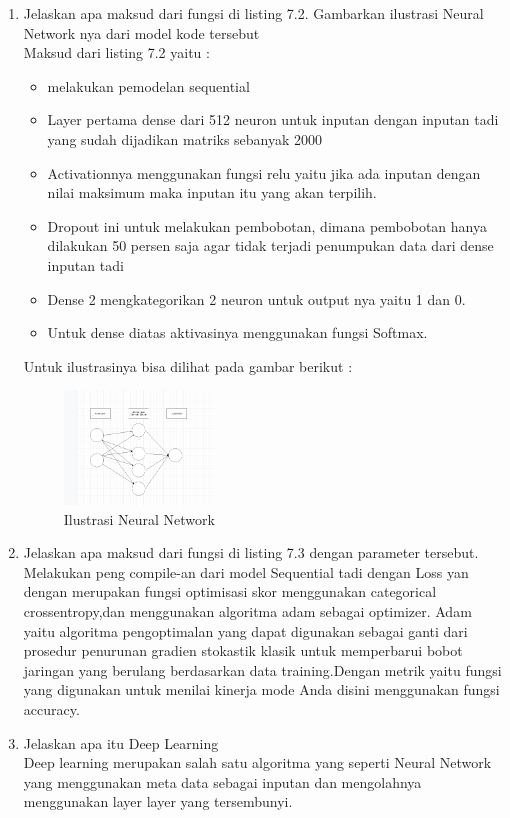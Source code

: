 \begin{enumerate}
\item Jelaskan apa maksud dari fungsi di listing 7.2. Gambarkan ilustrasi Neural Network nya dari model kode tersebut\\
Maksud dari listing 7.2 yaitu :
\begin{itemize}
\item melakukan pemodelan sequential
\item Layer pertama dense dari 512 neuron untuk inputan dengan inputan tadi yang sudah dijadikan matriks sebanyak 2000
\item Activationnya menggunakan fungsi relu yaitu jika ada inputan dengan nilai maksimum maka inputan itu yang akan terpilih.
\item Dropout ini untuk melakukan pembobotan, dimana pembobotan hanya dilakukan 50 persen saja agar tidak terjadi penumpukan data dari dense inputan tadi
\item Dense 2 mengkategorikan 2 neuron untuk output nya yaitu 1 dan 0.
\item Untuk dense diatas aktivasinya menggunakan fungsi Softmax. 
\end{itemize}
Untuk ilustrasinya bisa dilihat pada gambar berikut :
\hfill\break
	\begin{figure}[H]
		\includegraphics[width=4cm]{figures/1174054/7/9.png}
		\centering
		\caption{Ilustrasi Neural Network}
	\end{figure}

\item Jelaskan apa maksud dari fungsi di listing 7.3 dengan parameter tersebut.\\
Melakukan peng compile-an dari model Sequential tadi dengan Loss yan dengan merupakan fungsi optimisasi skor menggunakan categorical crossentropy,dan menggunakan algoritma adam sebagai optimizer. Adam yaitu algoritma pengoptimalan yang dapat digunakan sebagai ganti dari prosedur penurunan gradien stokastik klasik untuk memperbarui bobot jaringan yang berulang berdasarkan data training.Dengan metrik yaitu fungsi yang digunakan untuk menilai kinerja mode Anda disini menggunakan fungsi accuracy. 

\item Jelaskan apa itu Deep Learning\\
Deep learning merupakan salah satu algoritma yang seperti Neural Network yang menggunakan meta data sebagai inputan dan mengolahnya menggunakan layer layer yang tersembunyi.


\end{enumerate}

